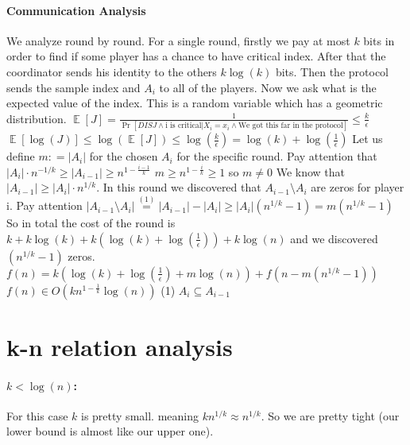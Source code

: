\documentclass{article}
\theoremstyle{plain}
\begin{document}
\paragraph{Communication Analysis}
We analyze round by round. For a single round, firstly we pay at most $k$ bits in order to find if some player has a chance to have critical index. After that the coordinator sends his identity to the others $k\log(k)$ bits. Then the protocol sends the sample index and $A_{i}$ to all of the players. Now we ask what is the expected value of the index. \newline
This is a random variable which has a geometric distribution. \newline
$ \mathop{\mathbb{E}} [J] = \frac{1}{\Pr[DISJ \land \text{i is critical} | X_i = x_i \land \text{We got this far in the protocol}]} \leq \frac{k}{\epsilon}$ \newline
$\mathop{\mathbb{E}} [\log(J)] \leq \log(\mathop{\mathbb{E}} [J]) \leq \log(\frac{k}{\epsilon}) = \log(k) + \log(\frac{1}{\epsilon})$ \newline
Let us define $m : = |A_i|$ for the chosen $A_i$ for the specific round.
Pay attention that $|A_i| \cdot n^{-1/k} \geq |A_{i-1}| \geq n^{1-\frac{i-1}{k}}$ \newline
$m \geq n^{1-\frac{i}{k}} \geq 1$ so $m \neq 0$\newline
We know that $|A_{i-1}| \geq |A_i| \cdot n^{1/k}$. In this round we discovered that $A_{i-1} \setminus A_i$ are zeros for player i. Pay attention $|A_{i-1} \setminus A_i| \overset{(1)}{=} |A_{i-1}| - |A_i| \geq |A_i|(n^{1/k} - 1) = m(n^{1/k} - 1)$ \newline
So in total the cost of the round is $k + k\log(k) + k(\log(k) + \log(\frac{1}{\epsilon})) + k\log(n)$ and we discovered $(n^{1/k} - 1)$ zeros. \newline
$f(n) = k(\log(k) + \log(\frac{1}{\epsilon}) + m\log(n)) + f(n - m(n^{1/k} - 1))$ \newline 
$f(n) \in O(kn^{1-\frac{1}{k}}\log(n))$ \newline
(1) $A_i \subseteq A_{i-1}$
\section{k-n relation analysis}
\paragraph{$k < \log(n)$:}
For this case $k$ is pretty small. meaning $kn^{1/k} \approx n^{1/k}$. So we are pretty tight (our lower bound is almost like our upper one).
\end{document}
